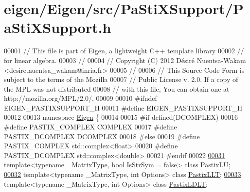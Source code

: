 \hypertarget{eigen_2_eigen_2src_2_pa_sti_x_support_2_pa_sti_x_support_8h_source}{}\section{eigen/\+Eigen/src/\+Pa\+Sti\+X\+Support/\+Pa\+Sti\+X\+Support.h}
\label{eigen_2_eigen_2src_2_pa_sti_x_support_2_pa_sti_x_support_8h_source}

\begin{DoxyCode}
00001 \textcolor{comment}{// This file is part of Eigen, a lightweight C++ template library}
00002 \textcolor{comment}{// for linear algebra.}
00003 \textcolor{comment}{//}
00004 \textcolor{comment}{// Copyright (C) 2012 Désiré Nuentsa-Wakam <desire.nuentsa\_wakam@inria.fr>}
00005 \textcolor{comment}{//}
00006 \textcolor{comment}{// This Source Code Form is subject to the terms of the Mozilla}
00007 \textcolor{comment}{// Public License v. 2.0. If a copy of the MPL was not distributed}
00008 \textcolor{comment}{// with this file, You can obtain one at http://mozilla.org/MPL/2.0/.}
00009 
00010 \textcolor{preprocessor}{#ifndef EIGEN\_PASTIXSUPPORT\_H}
00011 \textcolor{preprocessor}{#define EIGEN\_PASTIXSUPPORT\_H}
00012 
00013 \textcolor{keyword}{namespace }\hyperlink{namespace_eigen}{Eigen} \{ 
00014 
00015 \textcolor{preprocessor}{#if defined(DCOMPLEX)}
00016 \textcolor{preprocessor}{  #define PASTIX\_COMPLEX  COMPLEX}
00017 \textcolor{preprocessor}{  #define PASTIX\_DCOMPLEX DCOMPLEX}
00018 \textcolor{preprocessor}{#else}
00019 \textcolor{preprocessor}{  #define PASTIX\_COMPLEX  std::complex<float>}
00020 \textcolor{preprocessor}{  #define PASTIX\_DCOMPLEX std::complex<double>}
00021 \textcolor{preprocessor}{#endif}
00022 
\hyperlink{class_eigen_1_1_pastix_l_u}{00031} \textcolor{keyword}{template}<\textcolor{keyword}{typename} \_MatrixType, \textcolor{keywordtype}{bool} IsStrSym = false> \textcolor{keyword}{class }\hyperlink{class_eigen_1_1_pastix_l_u}{PastixLU};
\hyperlink{class_eigen_1_1_pastix_l_l_t}{00032} \textcolor{keyword}{template}<\textcolor{keyword}{typename} \_MatrixType, \textcolor{keywordtype}{int} Options> \textcolor{keyword}{class }\hyperlink{class_eigen_1_1_pastix_l_l_t}{PastixLLT};
\hyperlink{class_eigen_1_1_pastix_l_d_l_t}{00033} \textcolor{keyword}{template}<\textcolor{keyword}{typename} \_MatrixType, \textcolor{keywordtype}{int} Options> \textcolor{keyword}{class }\hyperlink{class_eigen_1_1_pastix_l_d_l_t}{PastixLDLT};

\end{DoxyCode}
